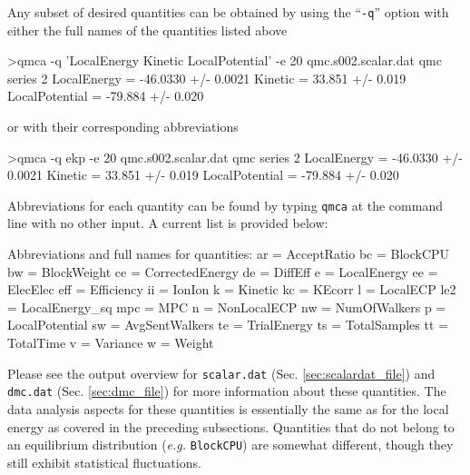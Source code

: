 Any subset of desired quantities can be obtained by using the 
``\texttt{-q}'' option with either the full names of the quantities 
listed above 
\begin{shade}
>qmca -q 'LocalEnergy Kinetic LocalPotential' -e 20 qmc.s002.scalar.dat 
qmc  series 2 
  LocalEnergy           =          -46.0330 +/-           0.0021 
  Kinetic               =            33.851 +/-            0.019 
  LocalPotential        =           -79.884 +/-            0.020 
\end{shade}
\noindent
or with their corresponding abbreviations
\begin{shade}
>qmca -q ekp -e 20 qmc.s002.scalar.dat 
qmc  series 2 
  LocalEnergy           =          -46.0330 +/-           0.0021 
  Kinetic               =            33.851 +/-            0.019 
  LocalPotential        =           -79.884 +/-            0.020 
\end{shade}
\noindent
Abbreviations for each quantity can be found by typing \texttt{qmca}
at the command line with no other input.  A current list is provided 
below:
\begin{shade}
  Abbreviations and full names for quantities:
    ar              = AcceptRatio
    bc              = BlockCPU
    bw              = BlockWeight
    ce              = CorrectedEnergy
    de              = DiffEff
    e               = LocalEnergy
    ee              = ElecElec
    eff             = Efficiency
    ii              = IonIon
    k               = Kinetic
    kc              = KEcorr
    l               = LocalECP
    le2             = LocalEnergy_sq
    mpc             = MPC
    n               = NonLocalECP
    nw              = NumOfWalkers
    p               = LocalPotential
    sw              = AvgSentWalkers
    te              = TrialEnergy
    ts              = TotalSamples
    tt              = TotalTime
    v               = Variance
    w               = Weight
\end{shade}
\noindent
Please see the output overview for \texttt{scalar.dat} 
(Sec. \ref{sec:scalardat_file}) and \texttt{dmc.dat} 
(Sec. \ref{sec:dmc_file}) for more information about 
these quantities.  The data analysis aspects for these 
quantities is essentially the same as for the local 
energy as covered in the preceding subsections. 
Quantities that do not belong to an equilibrium distribution 
(\emph{e.g.} \texttt{BlockCPU}) are somewhat different, though they 
still exhibit statistical fluctuations.


